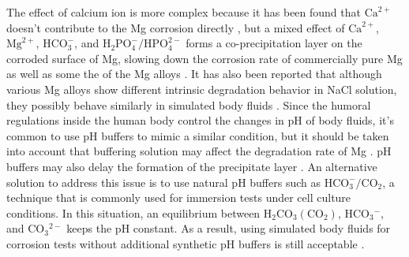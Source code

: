 The effect of calcium ion is more complex because it has been found that $\mathrm{Ca}^{2+}$ doesn't contribute to the Mg corrosion directly \cite{Willumeit-Roemer2019}, but a mixed effect of $\mathrm{Ca}^{2+}$, $\mathrm{Mg}^{2+}$, $\mathrm{HCO}_{3}^{-}$, and $\mathrm{H}_{2} \mathrm{PO}_{4}^{-} / \mathrm{HPO}_{4}^{2-}$ forms a co-precipitation layer on the corroded surface of Mg, slowing down the corrosion rate of commercially pure Mg as well as some the of the Mg alloys \cite{Mei2019,Lamaka2018}. It has also been reported that although various Mg alloys show different intrinsic degradation behavior in NaCl solution, they possibly behave similarly in simulated body fluids \cite{Agha2016,Mei2019a}. Since the humoral regulations inside the human body control the changes in pH of body fluids, it's common to use pH buffers to mimic a similar condition, but it should be taken into account that buffering solution may affect the degradation rate of Mg \cite{Cui2017,Kannan2017}. pH buffers may also delay the formation of the precipitate layer \cite{Lamaka2018}. An alternative solution to address this issue is to use natural pH buffers such as $\mathrm{HCO}_{3}^{-}/\mathrm{CO}_{2}$, a technique that is commonly used for immersion tests under cell culture conditions. In this situation, an equilibrium between $\mathrm{H}_{2} \mathrm{CO}_{3}\left(\mathrm{CO}_{2}\right)$, $\mathrm{HCO}_{3}{ }^{-}$, and $\mathrm{CO}_{3}{ }^{2-}$ keeps the pH constant. As a result, using simulated body fluids for corrosion tests without additional synthetic pH buffers is still acceptable \cite{Lamaka2018,Mei2019a}.

